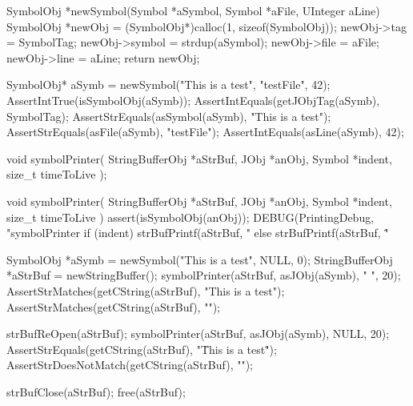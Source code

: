 \startCCode
SymbolObj *newSymbol(Symbol *aSymbol, Symbol *aFile, UInteger aLine) {
  SymbolObj *newObj =
    (SymbolObj*)calloc(1, sizeof(SymbolObj));
  newObj->tag    = SymbolTag;
  newObj->symbol = strdup(aSymbol);
  newObj->file   = aFile;
  newObj->line   = aLine;
  return newObj;
}
\stopCCode


\startCTest
  SymbolObj* aSymb = newSymbol("This is a test", "testFile", 42);
  AssertIntTrue(isSymbolObj(aSymb));
  AssertIntEquals(getJObjTag(aSymb), SymbolTag);
  AssertStrEquals(asSymbol(aSymb), "This is a test");
  AssertStrEquals(asFile(aSymb), "testFile");
  AssertIntEquals(asLine(aSymb), 42);
\stopCTest
\stopTestCase
\stopTestSuite

\startTestSuite[symbolPrinter]

\startCHeader
void symbolPrinter(
  StringBufferObj *aStrBuf,
  JObj            *anObj,
  Symbol          *indent,
  size_t           timeToLive
);
\stopCHeader

\startCCode
void symbolPrinter(
  StringBufferObj *aStrBuf,
  JObj            *anObj,
  Symbol          *indent,
  size_t           timeToLive
) {
  assert(isSymbolObj(anObj));
  DEBUG(PrintingDebug, "symbolPrinter %
  if (indent) {
    strBufPrintf(aStrBuf, "%
  } else {
    strBufPrintf(aStrBuf, "\"%
  }
}
\stopCCode


\startCTest
  SymbolObj *aSymb = newSymbol("This is a test", NULL, 0);
  StringBufferObj *aStrBuf = newStringBuffer();
  symbolPrinter(aStrBuf, asJObj(aSymb), "  ", 20);
  AssertStrMatches(getCString(aStrBuf), "This is a test");
  AssertStrMatches(getCString(aStrBuf), "\n");
  
  strBufReOpen(aStrBuf);
  symbolPrinter(aStrBuf, asJObj(aSymb), NULL, 20);
  AssertStrEquals(getCString(aStrBuf), "\"This is a test\" ");
  AssertStrDoesNotMatch(getCString(aStrBuf), "\n");
  
  strBufClose(aStrBuf);
  free(aStrBuf);
\stopCTest

\stopTestCase
\stopTestSuite
